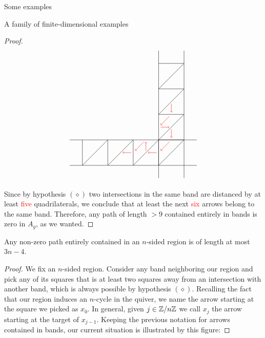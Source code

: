 \begin{chapter}{Some examples}
\begin{section}{A family of finite-dimensional examples}
\begin{proof}
\[
\begin{tikzpicture}
\draw (-3.5*1.25, 0) -- (1.5*1.25, 0);
\draw (-3.5*1.25, -1.25) -- (1.5*1.25, -1.25);
\draw (0,3.5*1.25) -- (0,-1.5*1.25);
\draw (1.25,3.5*1.25) -- (1.25,-1.5*1.25);

\foreach \x in {-3.75,-2.5,...,0}
{
\draw (\x,-1.25) -- (\x+1.25, 0);
\draw (0, -\x) -- (1.25, -\x);
\draw (\x,0) -- (\x, -1.25);
}

\foreach \x in {0,1.25,...,2.5}
\draw (0, \x) -- (1.25, \x+1.25);

\draw[->, red] (0.5*1.25, 1.5*1.25 - 0.1) -- (0.5*1.25, 1.25 + 0.1);
\draw[->, red] (0.5*1.25 - 0.1, 1.25-0.1) -- (0.1, 0.5*1.25+0.1);
\draw[->, red] (0.1, 0.5*1.25) -- (0.5*1.25 - 0.1, 0.5*1.25);
\draw[->, red] (0.5*1.25, 0.5*1.25-0.1) -- (0.5*1.25, 0.1);
\draw[->, red] (0.5*1.25 - 0.1, -0.1) -- (0.1, -0.5*1.25+0.1);
\draw[->, red] (-0.1, -0.5*1.25) -- (-0.5*1.25+0.1, -0.5*1.25);
\draw[->, red] (-0.5*1.25, -0.5*1.25+0.1) -- (-0.5*1.25, -0.1);
\draw[->, red] (-0.5*1.25 - 0.1, -0.1) -- (-1.25 + 0.1, -0.5*1.25+0.1);
\draw[->, red] (-1.25 -0.1, -0.5*1.25) -- (-1.5*1.25+0.1, -0.5*1.25);
\end{tikzpicture}
\]

Since by hypothesis $(\diamond)$ two intersections in the same band are distanced by at least \textcolor{red}{five} quadrilaterals, we conclude that at least the next \textcolor{red}{six} arrows belong to the same band. Therefore, any path of length $>9$ contained entirely in bands is zero in $A_g$, as we wanted.
\end{proof}

\begin{lemma}\label{long-region-paths} Any non-zero path entirely contained in an $n$-sided region is of length at most $3n-4$.
\end{lemma}
\begin{proof} We fix an $n$-sided region. Consider any band neighboring our region and pick any of its squares that is at least two squares away from an intersection with another band, which is always possible by hypothesis $(\diamond)$. Recalling the fact that our region induces an $n$-cycle in the quiver, we name the arrow starting at the square we picked as $x_0$. In general, given $j\in \mathbb{Z}/n\mathbb{Z}$ we call $x_j$ the arrow starting at the target of $x_{j-1}$. Keeping the previous notation for arrows contained in bands, our current situation is illustrated by this figure:


\end{proof}
\end{section}
\end{chapter}
